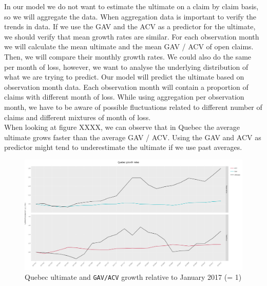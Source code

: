 	In our model we do not want to estimate the ultimate on a claim by claim basis, so we will aggregate the data. When aggregation data is important to verify the trends in data. If we use the GAV and the ACV as a predictor for the ultimate, we should verify that mean growth rates are similar. For each observation month we will calculate the mean ultimate and the mean GAV / ACV of open claims. Then, we will compare their monthly growth rates.  We could also do the same per month of loss, however, we want to analyse the underlying distribution of what we are trying to predict. Our model will predict the ultimate based on observation month data. Each observation month will contain a proportion of claims with different month of loss. While using aggregation per observation month, we have to be aware of possible fluctuations related to different number of claims and different mixtures of month of loss.\\
	When looking at figure XXXX, we can observe that in Quebec the average ultimate grows faster than the average GAV / ACV. Using the GAV and ACV as predictor might tend to underestimate the ultimate if we use past averages. 
	
	\begin{figure}[H]
		\begin{center}
			\includegraphics[scale=0.2]{Graphiques/QC_growth} 
			\renewcommand{\figurename}{Figure}
			\caption{Quebec ultimate and \texttt{GAV/ACV} growth relative to January 2017 (= 1)}\label{Fig_QC_growth}
		\end{center}
	\end{figure}

